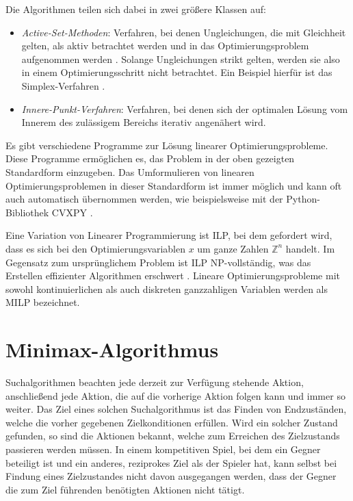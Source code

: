 Die Algorithmen teilen sich dabei in zwei größere Klassen auf:

\begin{itemize}
    \item \emph{Active-Set-Methoden}: Verfahren, bei denen Ungleichungen, die mit Gleichheit gelten, als aktiv betrachtet werden und in das Optimierungsproblem aufgenommen werden \cite[S. 243]{2023.OptimizationLectureNotes}. Solange Ungleichungen strikt gelten, werden sie also in einem Optimierungsschritt nicht betrachtet. Ein Beispiel hierfür ist das Simplex-Verfahren \cite[S. 248]{2023.OptimizationLectureNotes}.
    \item \emph{Innere-Punkt-Verfahren}: Verfahren, bei denen sich der optimalen Lösung vom Innerem des zulässigem Bereichs iterativ angenähert wird. \cite[S. 261]{2023.InteriorPoint}
\end{itemize}

Es gibt verschiedene Programme zur Lösung linearer Optimierungsprobleme. Diese Programme ermöglichen es, das Problem in der oben gezeigten Standardform einzugeben. Das Umformulieren von linearen Optimierungsproblemen in dieser Standardform ist immer möglich und kann oft auch automatisch übernommen werden, wie beispielsweise mit der Python-Bibliothek CVXPY \cite[S. 1]{2016.CVXPY}.

Eine Variation von Linearer Programmierung ist \ac{ILP}, bei dem gefordert wird, dass es sich bei den Optimierungsvariablen $x$ um ganze Zahlen $\mathbb{Z}^{n}$ handelt. Im Gegensatz zum ursprünglichem Problem ist \ac{ILP} NP-vollständig, was das Erstellen effizienter Algorithmen erschwert \cite[S. 173]{2002.MathProgramming}. Lineare Optimierungsprobleme mit sowohl kontinuierlichen als auch diskreten ganzzahligen Variablen werden als \ac{MILP} bezeichnet.

\section{Minimax-Algorithmus}
\label{chapter:minimax-algorithmus}

Suchalgorithmen beachten jede derzeit zur Verfügung stehende Aktion, anschließend jede Aktion, die auf die vorherige Aktion folgen kann und immer so weiter. Das Ziel eines solchen Suchalgorithmus ist das Finden von Endzuständen, welche die vorher gegebenen Zielkonditionen erfüllen. Wird ein solcher Zustand gefunden, so sind die Aktionen bekannt, welche zum Erreichen des Zielzustands passieren werden müssen. In einem kompetitiven Spiel, bei dem ein Gegner beteiligt ist und ein anderes, reziprokes Ziel als der Spieler hat, kann selbst bei Findung eines Zielzustandes nicht davon ausgegangen werden, dass der Gegner die zum Ziel führenden benötigten Aktionen nicht tätigt.

